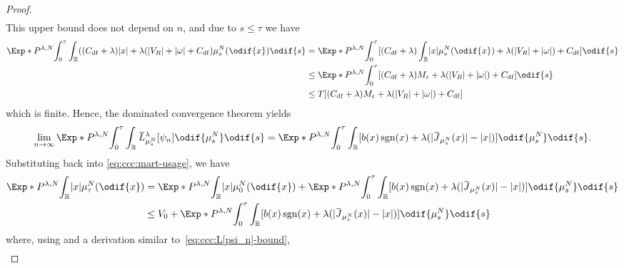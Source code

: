 \begin{proof}
\begin{equation}
\begin{split}
    \end{split}
  \end{equation}
  This upper bound does not depend on \( n \), and due to \( s \leq \tau \) we have
  \begin{equation}
    \begin{split}
    \Exp*{P^{\lambda, N}}{\int_0^\tau \int_\potspace \br{ (C_\mathrm{df} + \lambda) \abs{x} + \lambda (\abs{V_R} + \abs{\omega} + C_\mathrm{df} } \mu_{s}^N(\odif{x}) \odif{s} }
    &= \Exp*{P^{\lambda, N}}{\int_0^\tau \sbr{ (C_\mathrm{df} + \lambda) \int_\potspace \abs{x} \mu_{s}^N(\odif{x}) + \lambda (\abs{V_R} + \abs{\omega}) + C_\mathrm{df} } \odif{s} } \\
    &\leq \Exp*{P^{\lambda, N}}{\int_0^\tau \sbr{ (C_\mathrm{df} + \lambda) M_\eps + \lambda (\abs{V_R} + \abs{\omega}) + C_\mathrm{df} } \odif{s} } \\
    &\leq T \sbr{ (C_\mathrm{df} + \lambda) M_\eps + \lambda (\abs{V_R} + \abs{\omega}) + C_\mathrm{df} }
    \end{split}
  \end{equation}
  which is finite.
  Hence, the dominated convergence theorem yields
  \begin{equation}
    \lim_{n\to\infty} \Exp*{P^{\lambda, N}}{\int_0^\tau \int_\potspace \ol{L}_{\mu_{s}^N}^{\lambda} [\psi_n] \odif{\mu_{s}^N} \odif{s} }
    = \Exp*{P^{\lambda, N}}{\int_0^\tau \int_\potspace \sbr{ b(x) \sgn(x) + \lambda (\abs{\ol{J}_{\mu_{s}^N}(x)} - \abs{x}) } \odif{\mu_{s}^N} \odif{s} }.
  \end{equation}
  Substituting back into \eqref{eq:ccc:mart-usage}, we have
  \begin{equation}
    \begin{split}
    \Exp*{P^{\lambda, N}}{\int_\potspace \abs{x} \mu_\tau^N(\odif{x})} &= \Exp*{P^{\lambda, N}}{\int_\potspace \abs{x} \mu_0^N(\odif{x})} + \Exp*{P^{\lambda, N}}{\int_0^\tau \int_\potspace \sbr{ b(x) \sgn(x) + \lambda (\abs{\ol{J}_{\mu_{s}^N}(x)} - \abs{x}) } \odif{\mu_{s}^N} \odif{s} } \\
    &\leq V_0 + \Exp*{P^{\lambda, N}}{\int_0^\tau \int_\potspace \sbr{ b(x) \sgn(x) + \lambda (\abs{\ol{J}_{\mu_{s}^N}(x)} - \abs{x}) } \odif{\mu_{s}^N} \odif{s} } \\
    \end{split}
  \end{equation}
  where, using  and a derivation similar to~\eqref{eq:ccc:L[psi_n]-bound},
  \begin{equation}
    \begin{split}

\end{split}
\end{equation}
\end{proof}

